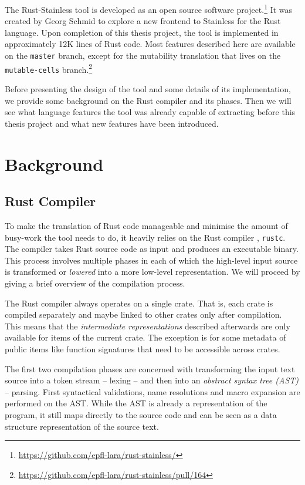 The Rust-Stainless tool is developed as an open source software
project.\footnote{\url{https://github.com/epfl-lara/rust-stainless/}} It was
created by Georg Schmid to explore a new frontend to Stainless for the Rust
language. Upon completion of this thesis project, the tool is implemented in
approximately 12K lines of Rust code. Most features described here are available
on the \lstinline!master! branch, except for the mutability translation that
lives on the \lstinline!mutable-cells!
branch.\footnote{\url{https://github.com/epfl-lara/rust-stainless/pull/164}}

Before presenting the design of the tool and some details of its implementation,
we provide some  background on the Rust compiler and its phases. Then we will
see what language features the tool was already capable of extracting before
this thesis project and what new features have been introduced.


\section{Background}

\subsection{Rust Compiler}

To make the translation of Rust code manageable and minimise the amount of
busy-work the tool needs to do, it heavily relies on the Rust compiler
\cite{rustc-guide}, \passthrough{\lstinline!rustc!}. The compiler takes Rust
source code as input and produces an executable binary. This process involves
multiple phases in each of which the high-level input source is transformed or
\emph{lowered} into a more low-level representation. We will proceed by giving a
brief overview of the compilation process.

The Rust compiler always operates on a single crate. That is, each crate is
compiled separately and maybe linked to other crates only after compilation.
This means that the \emph{intermediate representations} described afterwards are
only available for items of the current crate. The exception is for some
metadata of public items like function signatures that need to be accessible
across crates.

The first two compilation phases are concerned with transforming the input text
source into a token stream -- lexing -- and then into an \emph{abstract syntax
tree (AST)} -- parsing. First syntactical validations, name resolutions and
macro expansion are performed on the AST. While the AST is already a
representation of the program, it still maps directly to the source code and can
be seen as a data structure representation of the source text.

